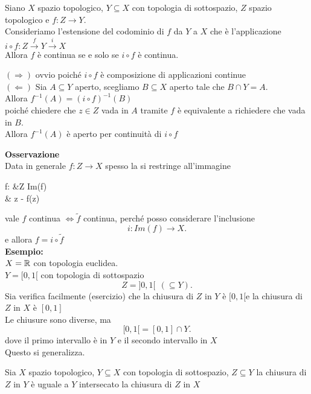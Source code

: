 \documentclass{article}
\begin{document}
	\begin{prop}
		Siano $X$ spazio topologico, $Y\subseteq X$ con topologia di sottospazio, $Z$ spazio topologico e $f : Z \rightarrow Y$.\\
		Consideriamo l'estensione del codominio di $f$ da $Y$ a $X$ che è l'applicazione  $i\circ f :Z\xrightarrow{f} Y \xrightarrow{i} X$\\
		Allora $f$ è continua se e solo se $i\circ f$ è continua.
	\end{prop}
	\begin{dimo}
		$ ( \Rightarrow )$ ovvio poiché $i\circ f$ è composizione di applicazioni continue\\
		$ ( \Leftarrow)$ Sia $A\subseteq Y$ aperto, scegliamo $B\subseteq X$ aperto tale che $B\cap Y = A$.\\
		Allora  $f^{-1}(A) = (i\circ f)^{-1}(B)$ \\
		poiché chiedere che $z\in Z$ vada in $A$ tramite $f$ è equivalente a richiedere che vada in $B$.\\
		Allora $f^{-1}(A)$ è aperto per continuità di $i\circ f$
	\end{dimo}
	\textbf{Osservazione}\\
	Data in generale $f: Z \rightarrow X$ spesso la si restringe all'immagine
	\begin{center}
		\begin{aligned}
			\tilde f: &Z \rightarrow Im(f)\\
				  & z - f(z)
		\end{aligned}
	\end{center}
	vale $f$ continua  $ \Leftrightarrow \tilde f$ continua, perché posso considerare l'inclusione 
	\[
	 i: Im(f) \rightarrow X
	.\]  
	e allora $f = i \circ \tilde f$\\
	 \textbf{Esempio:}\\
	 $X = \mathbb{R}$ con topologia euclidea.\\
	 $Y = [0,1[$ con topologia di sottospazio
	 \[
	  Z = ]0,1[ \ \ (\subseteq Y)
	 .\] 
	 Sia verifica facilmente (esercizio) che la chiusura di $Z$ in $Y$ è $[0,1[$e la chiusura di $Z$ in $X$ è $[0,1]$ \\
	 Le chiusure sono diverse, ma
	 \[
	  [0,1[ = [0,1]\cap Y
	 .\] 
	 dove il primo intervallo è in $Y$ e il secondo intervallo in $X$\\
	 Questo si generalizza.
	 \begin{lemm}
	 	Sia $X$ spazio topologico, $Y\subseteq X$ con topologia di sottospazio, $Z\subseteq Y$ la chiusura di $Z$ in $Y$ è uguale a $Y$ intersecato la chiusura di $Z$ in $X$
	 \end{lemm}
\end{document}
